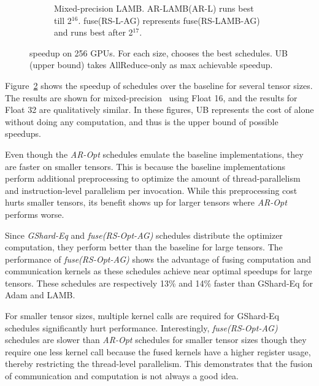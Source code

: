 \begin{figure}[t]
\begin{subfigure}{0.93\linewidth}
    \caption{Mixed-precision LAMB. AR-LAMB(AR-L) runs best till 2$^{16}$. fuse(RS-L-AG) represents fuse(RS-LAMB-AG) and runs best after 2$^{17}$.} 
    \label{fig:bandwidth64GPUs:lamb}
  \end{subfigure}
  \caption{\tool speedup on 256 GPUs. For each size, \tool chooses the best schedules.
   UB (upper bound) takes AllReduce-only as max achievable speedup.
   }
  \label{fig:bandwidth64GPUs}
\end{figure}

Figure~\ref{fig:bandwidth64GPUs} shows the speedup of \tool schedules over the baseline
for several tensor sizes. 
The results are shown for mixed-precision~\cite{mixed-precision-training} using Float 16, and the results for Float 32 are qualitatively similar. 
In these figures, UB represents the cost of \allreduce alone without doing any computation, and thus is the upper bound of possible speedups. 

Even though the \textit{AR-Opt} schedules emulate the baseline implementations, they are faster on smaller tensors.
This is because the baseline implementations perform additional preprocessing to optimize the amount of thread-parallelism and instruction-level parallelism per invocation. While this preprocessing cost hurts smaller tensors, its benefit shows up for larger tensors where \textit{AR-Opt} performs worse. 

Since \textit{GShard-Eq} and \textit{fuse(RS-Opt-AG)} schedules distribute the optimizer computation,  they perform better than the baseline for large tensors.
The performance of \textit{fuse(RS-Opt-AG)} shows the advantage of fusing computation and communication kernels as these schedules achieve near optimal speedups for large tensors. 
These schedules are respectively 13\% and 14\% faster than GShard-Eq for Adam and LAMB.

For smaller tensor sizes, multiple kernel calls are required for GShard-Eq schedules significantly hurt performance. Interestingly, \textit{fuse(RS-Opt-AG)} schedules are slower than \textit{AR-Opt} schedules for smaller tensor sizes though they require one less kernel call because the fused kernels have a higher register usage, thereby restricting the thread-level parallelism. This demonstrates that the fusion of communication and computation is not always a good idea.

